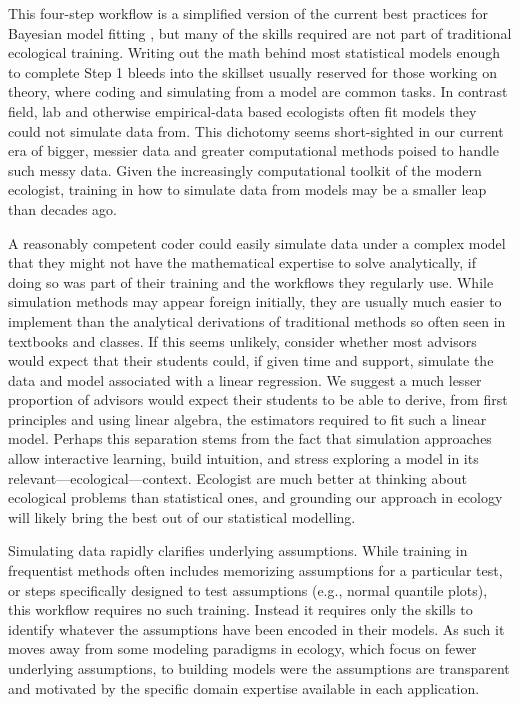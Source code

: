\documentclass[11pt]{article}
\begin{document}
{This four-step workflow is a simplified version of the current best practices for Bayesian model fitting  \citep{betanworkflow,vandeschoot2021}, but many of the skills required are not part of traditional ecological training. Writing out the math behind most statistical models enough to complete Step 1 bleeds into the skillset usually reserved for those working on theory, where coding and simulating from a model are common tasks. In contrast field, lab and otherwise empirical-data based ecologists often fit models they could not simulate data from. This dichotomy seems short-sighted in our current era of bigger, messier data and greater computational methods poised to handle such messy data. %
Given the increasingly computational toolkit of the modern ecologist, training in how to simulate data from models may be a smaller leap than decades ago.

A reasonably competent coder could easily simulate data under a complex model that they might not have the mathematical expertise to solve analytically, if doing so was part of their training and the workflows they regularly use. While simulation methods may appear foreign initially, they are usually much easier to implement than the analytical derivations of traditional methods so often seen in textbooks and classes. If this seems unlikely, consider whether most advisors would expect that their students could, if given time and support, simulate the data and model associated with a linear regression. We suggest a much lesser proportion of advisors would expect their students to be able to derive, from first principles and using linear algebra, the estimators required to fit such a linear model. Perhaps this separation stems from the fact that simulation approaches allow interactive learning, build intuition, and stress exploring a model in its relevant---ecological---context. Ecologist are much better at thinking about ecological problems than statistical ones, and grounding our approach in ecology will likely bring the best out of our statistical modelling. %

Simulating data rapidly clarifies underlying assumptions. While training in frequentist methods often includes memorizing assumptions for a particular test, or steps specifically designed to test assumptions (e.g., normal quantile plots), this workflow requires no such training. Instead it requires only the skills to identify whatever the assumptions have been encoded in their
models. As such it moves away from some modeling paradigms in ecology, which focus on fewer underlying assumptions, to
building models were the assumptions are transparent and motivated by the specific domain expertise available in each
application. %


}
\end{document}
